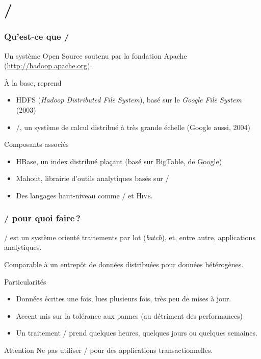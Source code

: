 

\section{\hadoop/}


\begin{frame}
\frametitle{Qu'est-ce que \hadoop/}

Un système \alert{Open Source} soutenu par la fondation Apache (\url{http://hadoop.apache.org}).

\vfill

À la base, reprend 

\begin{itemize}
  \item HDFS (\textit{Hadoop Distributed File System}), basé sur le \textit{Google File System} (2003)
  \item \mapreduce/, un système de calcul distribué à très grande échelle (Google aussi, 2004)
\end{itemize}

Composants associés

\begin{itemize}
  \item HBase, un index distribué plaçant (basé sur BigTable, de Google)
  \item Mahout, librairie d'outils analytiques basés sur \mapreduce/
  \item Des langages haut-niveau comme \pig/ et \textsc{Hive}.
\end{itemize}

\end{frame}


\begin{frame}
\frametitle{\hadoop/ pour quoi faire\,?}

\hadoop/ est un système orienté \alert{traitements par lot} (\textit{batch}), et, entre autre, \alert{applications analytiques}.

\vfill

Comparable à un entrepôt de données distribuées pour données hétérogènes.

\vfill

Particularités

\begin{itemize}
  \item Données écrites une fois, lues plusieurs fois, très peu de mises à jour.
  \item Accent mis sur la \alert{tolérance aux pannes} (au détriment des performances)
  \item Un traitement \mapreduce/ prend quelques heures, quelques jours ou quelques semaines.
\end{itemize}

\begin{block}{Attention}
\alert{Ne pas utiliser \hadoop/} pour des applications transactionnelles.
\end{block}
\end{frame}


